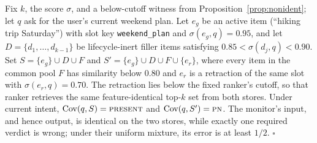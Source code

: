 \documentclass{article}
\newcommand{\present}{\textsc{present}}
\newcommand{\pn}{\textsc{pn}}
\begin{document}
Fix $k$, the score $\sigma$, and a below-cutoff witness from Proposition~\ref{prop:nonident}; let $q$ ask for the user's current weekend plan.
Let $e_g$ be an active item (``hiking trip Saturday'') with slot key \texttt{weekend\_plan} and $\sigma(e_g,q)=0.95$, and let $D=\{d_1,\ldots,d_{k-1}\}$ be lifecycle-inert filler items satisfying $0.85<\sigma(d_j,q)<0.90$.
Set $S=\{e_g\}\cup D\cup F$ and $S'=\{e_g\}\cup D\cup F\cup\{e_r\}$, where every item in the common pool $F$ has similarity below $0.80$ and $e_r$ is a retraction of the same slot with $\sigma(e_r,q)=0.70$.
The retraction lies below the fixed ranker's cutoff, so that ranker retrieves the same feature-identical top-$k$ set from both stores.
Under current intent, $\mathrm{Cov}(q,S)=\present$ and $\mathrm{Cov}(q,S')=\pn$.
The monitor's input, and hence output, is identical on the two stores, while exactly one required verdict is wrong; under their uniform mixture, its error is at least $1/2$.
\hfill$\square$
\end{document}
